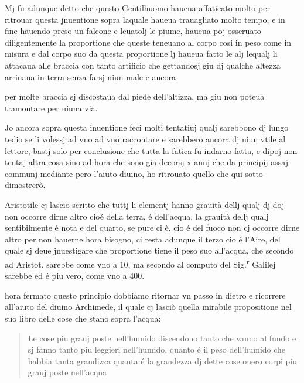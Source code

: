 \documentclass[11pt,a4paper]{article}
\begin{document}
Mj fu adunque detto che questo Gentilhuomo haueua affaticato molto per ritrouar questa jnuentione sopra laquale haueua trauagliato molto tempo, e in fine hauendo preso un falcone e leuatolj le piume, haueua poj osseruato diligentemente la proportione che queste teneuano al corpo cosi in peso come in misura e dal corpo suo da questa proportione lj haueua fatto le alj lequalj li attacaua alle braccia con tanto artificio che gettandosj giu dj qualche altezza arriuaua in terra senza farsj niun male e ancora


per molte braccia sj discostaua dal piede dell'altizza, ma giu non poteua tramontare per niuna via.

Jo ancora sopra questa inuentione feci molti tentatiuj qualj sarebbono dj lungo tedio se li volessj ad vno ad vno raccontare e sarebbero ancora dj niun vtile al lettore, bastj solo per conclusione che tutta la fatica fu indarno fatta, e dipoj non tentaj altra cosa sino ad hora che sono gia decorsj x annj che da principij assaj communj mediante pero l'aiuto diuino, ho ritrouato quello che qui sotto dimostrerò.

Aristotile cj lascio scritto che tuttj li elementj hanno grauità dellj qualj dj doj non occorre dirne altro cioé della terra, é dell'acqua, la grauità dellj qualj sentibilmente é nota e del quarto, se pure ci è, cio é del fuoco non cj occorre dirne altro per non hauerne hora bisogno, ci resta adunque il terzo cio é l'Aire, del quale sj deue jnuestigare che proportione tiene il peso suo all'acqua, che secondo ad Aristot. sarebbe come vno a 10, ma secondo al computo del Sig.\textsuperscript{r} Galilej sarebbe ed é piu vero, come vno a 400.

hora fermato questo principio dobbiamo ritornar vn passo in dietro e ricorrere all'aiuto del diuino Archimede, il quale cj lasciò quella mirabile propositione nel suo libro delle cose che stano sopra l'acqua:

\begin{quote}
Le cose piu grauj poste nell'humido discendono tanto che vanno al fundo e sj fanno tanto piu leggieri nell'humido, quanto é il peso dell'humido che habbia tanta grandizza quanta é la grandezza dj dette cose ouero corpi piu grauj poste nell'acqua
\end{quote}
\end{document}
